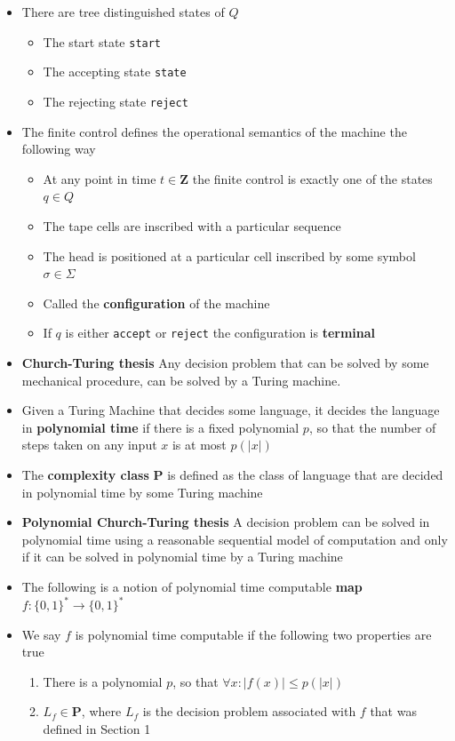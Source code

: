 \documentclass[11pt]{article}
\begin{document}
\begin{itemize}
\item There are tree distinguished states of \(Q\)
\begin{itemize}
\item The start state \texttt{start}
\item The accepting state \texttt{state}
\item The rejecting state \texttt{reject}
\end{itemize}

\item The finite control defines the operational semantics of the machine the following way
\begin{itemize}
\item At any point in time \(t \in \mathbf Z\) the finite control is exactly one of the states \(q \in Q\)
\item The tape cells are inscribed with a particular sequence
\item The head is positioned at a particular cell inscribed by some symbol \(\sigma \in \Sigma\)
\item Called the \textbf{configuration} of the machine
\item If \(q\) is either \texttt{accept} or \texttt{reject} the configuration is \textbf{terminal}
\end{itemize}

\item \textbf{Church-Turing thesis} Any decision problem that can be solved by some mechanical procedure, can be solved by a Turing machine.

\item Given a Turing Machine that decides some language, it decides the language in \textbf{polynomial time} if there is a fixed polynomial \(p\), so that the number of steps taken on any input \(x\) is at most \(p(|x|)\)

\item The \textbf{complexity class} \(\mathbf P\) is defined as the class of language that are decided in polynomial time by some Turing machine

\item \textbf{Polynomial Church-Turing thesis} A decision problem can be solved in polynomial time using a reasonable sequential model of computation and only if it can be solved in polynomial time by a Turing machine

\item The following is a notion of polynomial time computable \textbf{map} \(f : \{0,1\}^* \rightarrow \{0,1\}^*\)
\item We say \(f\) is polynomial time computable if the following two properties are true
\begin{enumerate}
\item There is a polynomial \(p\), so that \(\forall x : |f(x)| \leq p(|x|)\)
\item \(L_f \in \mathbf P\), where \(L_f\) is the decision problem associated with \(f\) that was defined in Section 1
\end{enumerate}


\end{itemize}
\end{document}
